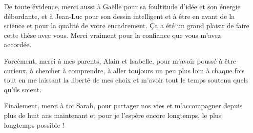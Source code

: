 De toute évidence, merci aussi à Gaëlle pour sa foultitude d'idée et son énergie
débordante, et à Jean-Luc pour son dessin intelligent et à être en avant de la science et
pour la qualité de votre encadrement.
Ça a été un grand plaisir de faire cette thèse avec vous. Merci vraiment pour la
confiance que vous m'avez accordée.

Forcément, merci à mes parents, Alain et Isabelle, pour m'avoir poussé à être curieux, à
chercher à comprendre, à aller toujours un peu plus loin à chaque fois tout en me
laissant la liberté de mes choix et m'avoir tout le temps soutenu quels qu'ils soient.

Finalement, merci à toi Sarah, pour partager nos vies et m'accompagner depuis plus de
huit ans maintenant et pour je l'espère encore longtemps, le plus longtemps possible !



